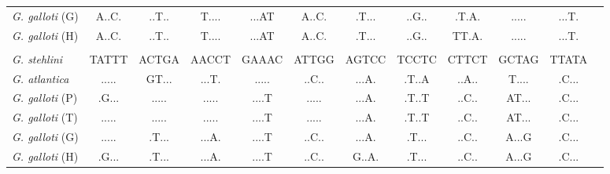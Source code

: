 \documentclass[12pt, hidelinks]{exam}
\begin{document}
\begin{landscape}
{\begin{longtable}[l]{lccccccccccc}
{\regfont\textit{G. galloti} (G)}	& A..C. & ..T.. & T.... & ...AT & A..C. & .T... & ..G.. & .T.A. & ..... & ...T. \tabularnewline
{\regfont\textit{G. galloti} (H)}	& A..C. & ..T.. & T.... & ...AT & A..C. & .T... & ..G.. & TT.A. & ..... & ...T. \tabularnewline
&&&&&&&&&&\tabularnewline
{\regfont\textit{G. stehlini}}	& TATTT & ACTGA & AACCT & GAAAC & ATTGG & AGTCC & TCCTC & CTTCT & GCTAG & TTATA \tabularnewline
{\regfont\textit{G. atlantica}}	& ..... & GT... & ...T. & ..... & ..C.. & ...A. & .T..A & ..A.. & T.... & .C... \tabularnewline
{\regfont\textit{G. galloti} (P)}	& .G... & ..... & ..... & ....T & ..... & ...A. & .T..T & ..C.. & AT... & .C... \tabularnewline
{\regfont\textit{G. galloti} (T)}	& ..... & ..... & ..... & ....T & ..... & ...A. & .T..T & ..C.. & AT... & .C... \tabularnewline
{\regfont\textit{G. galloti} (G)}	& ..... & .T... & ...A. & ....T & ..C.. & ...A. & .T... & ..C.. & A...G & .C... \tabularnewline
{\regfont\textit{G. galloti} (H)}	& .G... & .T... & ...A. & ....T & ..C.. & G..A. & .T... & ..C.. & A...G & .C... \tabularnewline
\bottomrule
\end{longtable}
}

\end{landscape}
\end{document}
